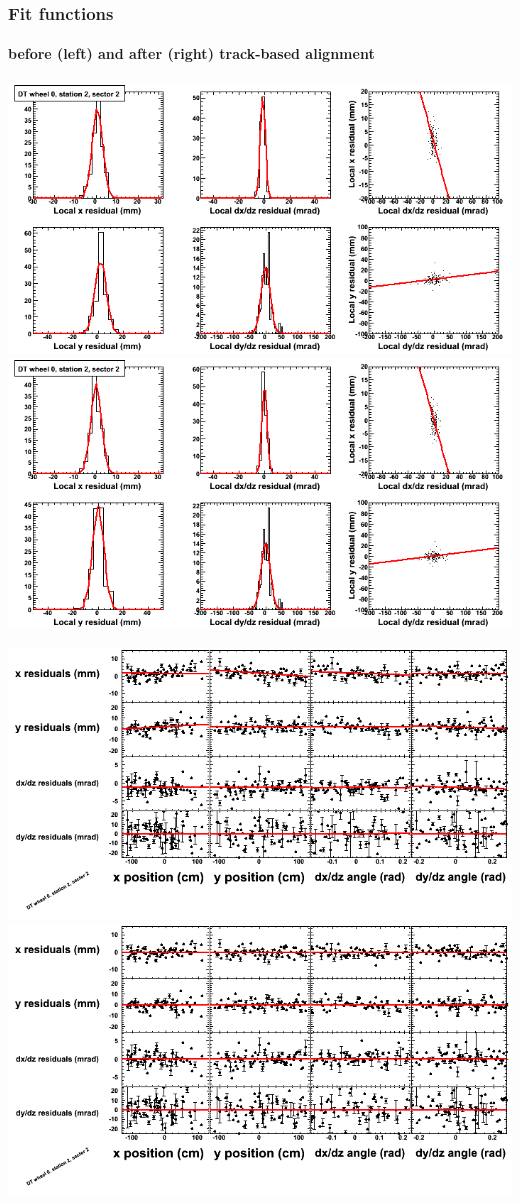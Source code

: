 \documentclass[compress]{beamer}
\begin{document}
\begin{frame}
\frametitle{Fit functions}
\framesubtitle{before (left) and after (right) track-based alignment}
\includegraphics[width=0.5\linewidth]{fitfunctions_re01/MBwhCst2sec02_bellcurves.png} \includegraphics[width=0.5\linewidth]{fitfunctions_re05/MBwhCst2sec02_bellcurves.png}

\includegraphics[width=0.5\linewidth]{fitfunctions_re01/MBwhCst2sec02_polynomials.png} \includegraphics[width=0.5\linewidth]{fitfunctions_re05/MBwhCst2sec02_polynomials.png}
\end{frame}
\end{document}

